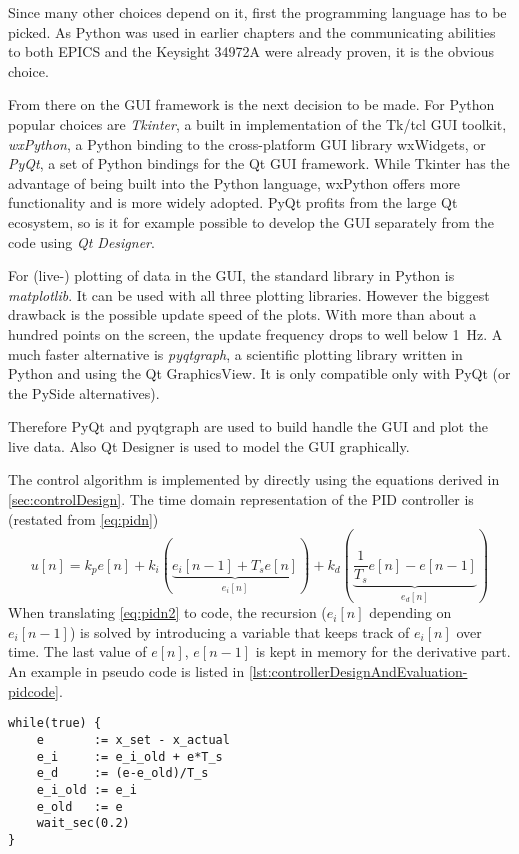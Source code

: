 Since many other choices depend on it, first the programming language has to be picked. As Python was used in earlier chapters and the communicating abilities to both EPICS and the Keysight 34972A were already proven, it is the obvious choice. 

From there on the GUI framework is the next decision to be made. For Python popular choices are \textit{Tkinter}, a built in implementation of the Tk/tcl GUI toolkit, \textit{wxPython}, a Python binding to the cross-platform GUI library wxWidgets, or \textit{PyQt}\cite{pyqt}, a set of Python bindings for the Qt GUI framework\cite{qt}. While Tkinter has the advantage of being built into the Python language, wxPython offers more functionality and is more widely adopted. PyQt profits from the large Qt ecosystem, so is it for example possible to develop the GUI separately from the code using \textit{Qt Designer}.

For (live-) plotting of data in the GUI, the standard library in Python is \textit{matplotlib}\cite{Hunter2007}. It can be used with all three plotting libraries. However the biggest drawback is the possible update speed of the plots. With more than about a hundred points on the screen, the update frequency drops to well below \SI{1}{\hertz}. A much faster alternative is \textit{pyqtgraph}\cite{pyqtgraph}, a scientific plotting library written in Python and using the Qt GraphicsView. It is only compatible only with PyQt (or the PySide alternatives).

Therefore PyQt and pyqtgraph are used to build handle the GUI and plot the live data. Also Qt Designer is used to model the GUI graphically.

The control algorithm is implemented by directly using the equations derived in \autoref{sec:controlDesign}. The time domain representation of the PID controller is (restated from \autoref{eq:pidn})
\begin{equation}\label{eq:pidn2}
u[n] = k_p e[n] 
+ k_i \left(\underbrace{e_i[n-1] + T_s e[n]}_{e_i[n]}\right) 
+ k_d \left(\underbrace{\frac{1}{T_s} e[n]-e[n-1]}_{e_d[n]}\right)
\end{equation}
When translating \autoref{eq:pidn2} to code, the recursion ($e_i[n]$ depending on $e_i[n-1]$) is solved by introducing a variable that keeps track of $e_i[n]$ over time. The last value of $e[n]$, $e[n-1]$ is kept in memory for the derivative part.
An example in pseudo code is listed in \autoref{lst:controllerDesignAndEvaluation-pidcode}.

\begin{lstlisting}[caption = PID controller implemented in pseudo code, label = lst:controllerDesignAndEvaluation-pidcode]
while(true) {
    e       := x_set - x_actual
    e_i     := e_i_old + e*T_s
    e_d     := (e-e_old)/T_s
    e_i_old := e_i
    e_old   := e
    wait_sec(0.2)
}
\end{lstlisting}

